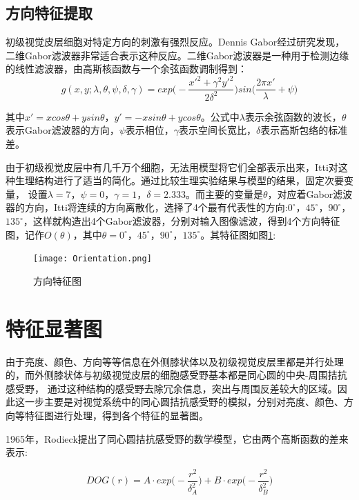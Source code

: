 \documentclass[a4paper,12pt]{article}
\begin{document}
\subsection{方向特征提取}

初级视觉皮层细胞对特定方向的刺激有强烈反应。Dennis Gabor经过研究发现，二维Gabor滤波器非常适合表示这种反应。二维Gabor滤波器是一种用于检测边缘的线性滤波器，由高斯核函数与一个余弦函数调制得到：
\begin{equation}
g(x,y;\lambda,\theta,\psi,\delta,\gamma)=exp\Big(-\frac{x'^2+\gamma^2y'^2}{2\delta^2}\Big)sin\big(\frac{2\pi x'}{\lambda}+\psi\big)
\end{equation}


其中$x'=xcos\theta+ysin\theta$，$y'=-xsin\theta+ycos\theta$。公式中$\lambda$表示余弦函数的波长，$\theta$表示Gabor滤波器的方向，$\psi$表示相位，$\gamma$表示空间长宽比，$\delta$表示高斯包络的标准差。


由于初级视觉皮层中有几千万个细胞，无法用模型将它们全部表示出来，Itti对这种生理结构进行了适当的简化。通过比较生理实验结果与模型的结果，固定次要变量，
设置$\lambda=7$，$\psi=0$，$\gamma=1$，$\delta=2.333$。而主要的变量是$\theta$，对应着Gabor滤波器的方向，Itti将连续的方向离散化，选择了4个最有代表性的方向:$0^\circ$，$45^\circ$，$90^\circ$，$135^\circ$，这样就构造出4个Gabor滤波器，分别对输入图像滤波，得到4个方向特征图，记作$O(\theta)$，其中$\theta=0^\circ，45^\circ，90^\circ，135^\circ$。其特征图如图\ref{fig:4}:
\begin{figure}[!htb]
\centering
\texttt{[image: Orientation.png]}
\caption{方向特征图}\label{fig:4} 
\end{figure}

\section{特征显著图}

由于亮度、颜色、方向等等信息在外侧膝状体以及初级视觉皮层里都是并行处理的，而外侧膝状体与初级视觉皮层的细胞感受野基本都是同心圆的中央-周围拮抗感受野，
通过这种结构的感受野去除冗余信息，突出与周围反差较大的区域。因此这一步主要是对视觉系统中的同心圆拮抗感受野的模拟，分别对亮度、颜色、方向等特征图进行处理，得到各个特征的显著图。


1965年，Rodieck提出了同心圆拮抗感受野的数学模型\cite{6:article}，它由两个高斯函数的差来表示:

\begin{equation}
DOG(r)=A\cdot exp\Big(-\frac{r^2}{\delta_{A}^{2}}\Big)+B\cdot exp\Big(-\frac{r^2}{\delta_{B}^{2}}\Big)
\end{equation}
\end{document}

